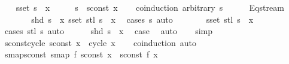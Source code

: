 \begin{isabellebody}
%
\isadelimproof
%
\endisadelimproof
%
\isatagproof
{}\isamarkupfalse%
\isanewline
\ \ \isamarkupfalse%
\ {\isachardoublequoteopen}sset\ s\ {\isacharequal}\ {\isacharbraceleft}x{\isacharbraceright}{\isachardoublequoteclose}\isanewline
\ \ \isamarkupfalse%
\ \isamarkupfalse%
\ {\isachardoublequoteopen}s\ {\isacharequal}\ sconst\ x{\isachardoublequoteclose}\isanewline
\ \ \isamarkupfalse%
\ {\isacharparenleft}coinduction\ arbitrary{\isacharcolon}\ s{\isacharparenright}\isanewline
\ \ \ \ \isamarkupfalse%
\ Eq{\isacharunderscore}stream\isanewline
\ \ \ \ \isamarkupfalse%
\ \isamarkupfalse%
\ {\isachardoublequoteopen}shd\ s\ {\isacharequal}\ x{\isachardoublequoteclose}\ {\isachardoublequoteopen}sset\ {\isacharparenleft}stl\ s{\isacharparenright}\ {\isasymsubseteq}\ {\isacharbraceleft}x{\isacharbraceright}{\isachardoublequoteclose}\ \isamarkupfalse%
\ {\isacharparenleft}cases\ s{\isacharsemicolon}\ auto{\isacharparenright}{\isacharplus}\isanewline
\ \ \ \ \isamarkupfalse%
\ \isamarkupfalse%
\ {\isachardoublequoteopen}sset\ {\isacharparenleft}stl\ s{\isacharparenright}\ {\isacharequal}\ {\isacharbraceleft}x{\isacharbraceright}{\isachardoublequoteclose}\ \isamarkupfalse%
\ {\isacharparenleft}cases\ {\isachardoublequoteopen}stl\ s{\isachardoublequoteclose}{\isacharparenright}\ auto\isanewline
\ \ \ \ \isamarkupfalse%
\ {\isacartoucheopen}shd\ s\ {\isacharequal}\ x{\isacartoucheclose}\ \isamarkupfalse%
\ {\isacharquery}case\ \isamarkupfalse%
\ auto\isanewline
\ \ \isamarkupfalse%
\isanewline
{}\isamarkupfalse%
\ simp%
\endisatagproof
{\isafoldproof}%
%
\isadelimproof
\isanewline
%
\endisadelimproof
\isanewline
{}\isamarkupfalse%
\ sconst{\isacharunderscore}cycle{\isacharcolon}\ {\isachardoublequoteopen}sconst\ x\ {\isacharequal}\ cycle\ {\isacharbrackleft}x{\isacharbrackright}{\isachardoublequoteclose}\isanewline
%
\isadelimproof
\ \ %
\endisadelimproof
%
\isatagproof
{}\isamarkupfalse%
\ coinduction\ auto%
\endisatagproof
{\isafoldproof}%
%
\isadelimproof
\isanewline
%
\endisadelimproof
\isanewline
{}\isamarkupfalse%
\ smap{\isacharunderscore}sconst{\isacharcolon}\ {\isachardoublequoteopen}smap\ f\ {\isacharparenleft}sconst\ x{\isacharparenright}\ {\isacharequal}\ sconst\ {\isacharparenleft}f\ x{\isacharparenright}{\isachardoublequoteclose}\isanewline

\end{isabellebody}
